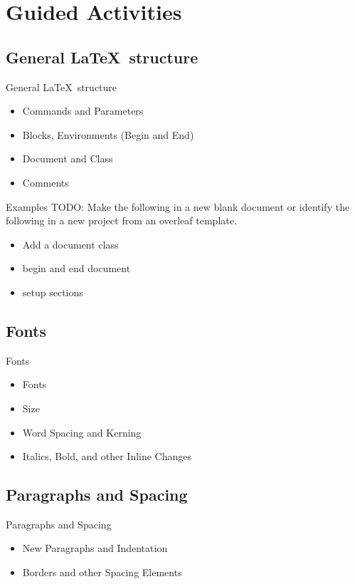 \documentclass{beamer}
\begin{document}
\section{Guided Activities}

\subsection{General \LaTeX\ structure}
\begin{frame}{General \LaTeX\ structure}
\begin{itemize}
  \item Commands and Parameters
  \item Blocks, Environments (Begin and End)
  \item Document and Class
  \item Comments
\end{itemize}

\begin{block}{Examples}
  TODO: Make the following in a new blank document or identify the following in a new project from an overleaf template.\\
  \begin{itemize}
    \item Add a document class
    \item begin and end document
    \item setup sections
  \end{itemize}
\end{block}
\end{frame}

\subsection{Fonts}
\begin{frame}{Fonts}
\begin{itemize}
\item Fonts
\item Size
\item Word Spacing and Kerning
\item Italics, Bold, and other Inline Changes
\end{itemize}
\end{frame}

\subsection{Paragraphs and Spacing}
\begin{frame}{Paragraphs and Spacing}
\begin{itemize}
\item New Paragraphs and Indentation
\item Borders and other Spacing Elements
\end{itemize}
\end{frame}
\end{document}
